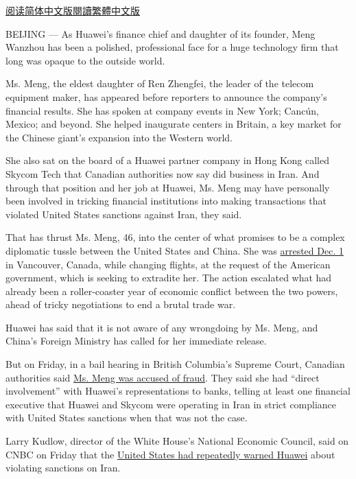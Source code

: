 \href{https://cn.nytimes.com/technology/20181210/meng-wanzhou-huawei-arrest/}{阅读简体中文版}\href{https://cn.nytimes.com/technology/20181210/meng-wanzhou-huawei-arrest/zh-hant/}{閱讀繁體中文版}

BEIJING --- As Huawei's finance chief and daughter of its founder, Meng
Wanzhou has been a polished, professional face for a huge technology
firm that long was opaque to the outside world.

Ms. Meng, the eldest daughter of Ren Zhengfei, the leader of the telecom
equipment maker, has appeared before reporters to announce the company's
financial results. She has spoken at company events in New York; Cancún,
Mexico; and beyond. She helped inaugurate centers in Britain, a key
market for the Chinese giant's expansion into the Western world.

She also sat on the board of a Huawei partner company in Hong Kong
called Skycom Tech that Canadian authorities now say did business in
Iran. And through that position and her job at Huawei, Ms. Meng may have
personally been involved in tricking financial institutions into making
transactions that violated United States sanctions against Iran, they
said.

That has thrust Ms. Meng, 46, into the center of what promises to be a
complex diplomatic tussle between the United States and China. She was
\href{https://www.nytimes.com/2018/12/05/business/huawei-cfo-arrest-canada-extradition.html}{arrested
Dec. 1} in Vancouver, Canada, while changing flights, at the request of
the American government, which is seeking to extradite her. The action
escalated what had already been a roller-coaster year of economic
conflict between the two powers, ahead of tricky negotiations to end a
brutal trade war.

Huawei has said that it is not aware of any wrongdoing by Ms. Meng, and
China's Foreign Ministry has called for her immediate release.

But on Friday, in a bail hearing in British Columbia's Supreme Court,
Canadian authorities said
\href{https://www.nytimes.com/2018/12/07/technology/huawei-meng-wanzhou-fraud.html}{Ms.
Meng was accused of fraud}. They said she had ``direct involvement''
with Huawei's representations to banks, telling at least one financial
executive that Huawei and Skycom were operating in Iran in strict
compliance with United States sanctions when that was not the case.

Larry Kudlow, director of the White House's National Economic Council,
said on CNBC on Friday that the
\href{https://www.nytimes.com/2018/12/07/us/politics/white-house-kudlow-huawei-arrest.html?action=click\&module=Top\%20Stories\&pgtype=Homepage}{United
States had repeatedly warned Huawei} about violating sanctions on Iran.

